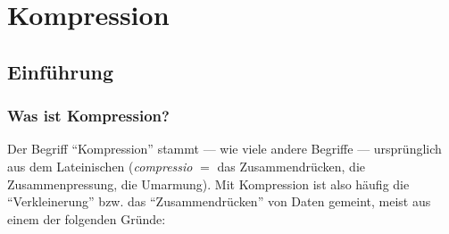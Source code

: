 \chapter{Kompression}\label{ch:Lektion}
\section{Einführung}

\subsection{Was ist Kompression?}

Der Begriff \enquote{Kompression} stammt --- wie viele andere Begriffe --- ursprünglich aus dem Lateinischen (\textit{compressio} $=$ das Zusammendrücken, die Zusammenpressung, die Umarmung). Mit Kompression ist also häufig die \enquote{Verkleinerung} bzw. das \enquote{Zusammendrücken} von Daten gemeint, meist aus einem der folgenden Gründe:

